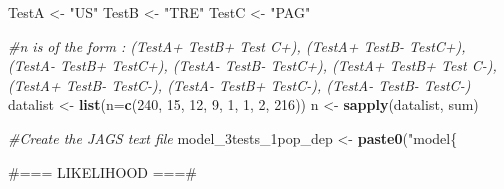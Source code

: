 \documentclass[
]{book}
\newenvironment{Shaded}{\begin{snugshade}}{\end{snugshade}}
\newcommand{\AttributeTok}[1]{\textcolor[rgb]{0.13,0.29,0.53}{#1}}
\newcommand{\CommentTok}[1]{\textcolor[rgb]{0.56,0.35,0.01}{\textit{#1}}}
\newcommand{\DecValTok}[1]{\textcolor[rgb]{0.00,0.00,0.81}{#1}}
\newcommand{\FunctionTok}[1]{\textcolor[rgb]{0.13,0.29,0.53}{\textbf{#1}}}
\newcommand{\NormalTok}[1]{#1}
\newcommand{\OtherTok}[1]{\textcolor[rgb]{0.56,0.35,0.01}{#1}}
\newcommand{\StringTok}[1]{\textcolor[rgb]{0.31,0.60,0.02}{#1}}
\begin{document}
\begin{Shaded}
\begin{Highlighting}[]
\NormalTok{TestA }\OtherTok{\textless{}{-}} \StringTok{"US"}
\NormalTok{TestB }\OtherTok{\textless{}{-}} \StringTok{"TRE"}
\NormalTok{TestC }\OtherTok{\textless{}{-}} \StringTok{"PAG"}

\CommentTok{\#n is of the form : (TestA+ TestB+ Test C+), (TestA+ TestB{-} TestC+), (TestA{-} TestB+ TestC+), (TestA{-} TestB{-} TestC+), (TestA+ TestB+ Test C{-}), (TestA+ TestB{-} TestC{-}), (TestA{-} TestB+ TestC{-}), (TestA{-} TestB{-} TestC{-})}
\NormalTok{datalist }\OtherTok{\textless{}{-}} \FunctionTok{list}\NormalTok{(}\AttributeTok{n=}\FunctionTok{c}\NormalTok{(}\DecValTok{240}\NormalTok{, }\DecValTok{15}\NormalTok{, }\DecValTok{12}\NormalTok{, }\DecValTok{9}\NormalTok{, }\DecValTok{1}\NormalTok{, }\DecValTok{1}\NormalTok{, }\DecValTok{2}\NormalTok{, }\DecValTok{216}\NormalTok{))}
\NormalTok{n }\OtherTok{\textless{}{-}} \FunctionTok{sapply}\NormalTok{(datalist, sum)}

\CommentTok{\#Create the JAGS text file}
\NormalTok{model\_3tests\_1pop\_dep }\OtherTok{\textless{}{-}} \FunctionTok{paste0}\NormalTok{(}\StringTok{"model\{}

\StringTok{\#=== LIKELIHOOD ===\#}


\end{Highlighting}
\end{Shaded}
\end{document}
